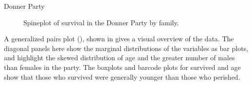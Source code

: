 \documentclass[11pt]{book}
\renewenvironment{knitrout}{\small\renewcommand{\baselinestretch}{.85}}{} %
\begin{document}
\begin{Example}[donner1]{Donner Party}
\begin{knitrout}
\begin{figure}[!htbp]
\caption[Spineplot of survival in the Donner Party by family]{Spineplot of survival in the Donner Party by family.\label{fig:donner1-spineplot}}
\end{figure}


\end{knitrout}


% 
% 

A generalized pairs plot (), shown in  gives a visual
overview of the data.  The diagonal panels here show the marginal distributions of the variables
as bar plots, and highlight the skewed distribution of age and the greater number of males
than females in the party.  The boxplots and barcode plots for survived and age show
that those who survived were generally younger than those who perished.
\begin{knitrout}
\color{fgcolor}\begin{kframe}
\begin{alltt}
\hlstd{(Donner[,}\hlstd{(}\hlstd{,}\hlstd{,}\hlstd{,}\hlstd{)],}
  \hlstd{=}\hlstd{(}\hlstd{=}\hlstd{,} \hlstd{=}\hlstd{),}
        \hlstd{=}\hlstd{(} \hlstd{=}\hlstd{(}\hlstd{,}\hlstd{)}
        \hlstd{)}
\end{alltt}
\end{kframe}\begin{figure}[!htbp]



\end{figure}
\end{knitrout}
\end{Example}
\end{document}
